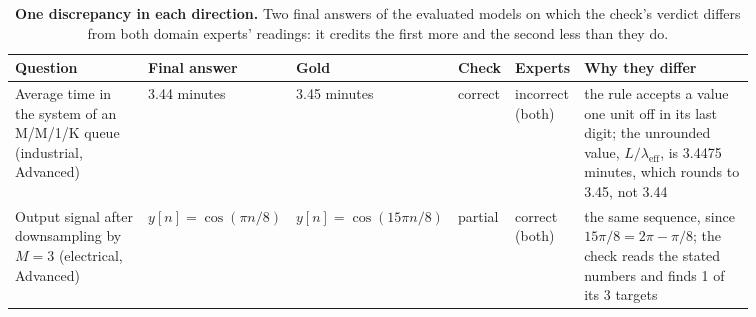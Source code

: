 \begin{table}[t]
    \centering
    \small
    \renewcommand{\arraystretch}{1.15}
    \begin{tabular}{@{}p{0.2\linewidth} p{0.12\linewidth} p{0.12\linewidth} p{0.07\linewidth} p{0.09\linewidth} p{0.26\linewidth}@{}}
        \toprule
        \rowcolor{gray!10}
        \textbf{Question} & \textbf{Final answer} & \textbf{Gold} & \textbf{Check} & \textbf{Experts} & \textbf{Why they differ} \\
        \midrule
        Average time in the system of an M/M/1/K queue (industrial, Advanced) & 3.44 minutes & 3.45 minutes & correct & incorrect (both) & the rule accepts a value one unit off in its last digit; the unrounded value, $L/\lambda_{\mathrm{eff}}$, is 3.4475 minutes, which rounds to 3.45, not 3.44 \\
        Output signal after downsampling by $M = 3$ (electrical, Advanced) & $y[n] = \cos(\pi n/8)$ & $y[n] = \cos(15\pi n/8)$ & partial & correct (both) & the same sequence, since $15\pi/8 = 2\pi - \pi/8$; the check reads the stated numbers and finds 1 of its 3 targets \\
        \bottomrule
    \end{tabular}
    \caption{\textbf{One discrepancy in each direction.} Two final answers of the evaluated models on which
    the check's verdict differs from both domain experts' readings: it credits the first more and the second
    less than they do.}
    \label{tab:answer_cases}
\end{table}

